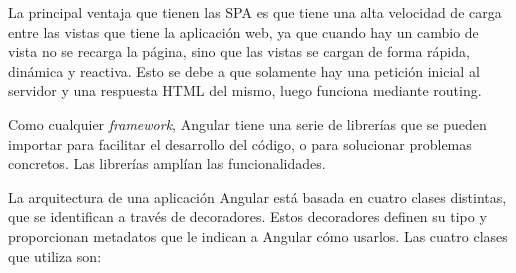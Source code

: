\documentclass[a4paper, 12pt]{book}
\begin{document}
La principal ventaja que tienen las SPA es que tiene una alta velocidad de carga entre las vistas que tiene la aplicación web, ya que cuando hay un cambio de vista no se recarga la página, sino que las vistas se cargan de forma rápida, dinámica y reactiva. 
Esto se debe a que solamente hay una petición inicial al servidor y una respuesta HTML del mismo, luego funciona mediante routing.

Como cualquier \emph{framework}, Angular tiene una serie de librerías que se pueden importar para facilitar el desarrollo del código, o para solucionar problemas concretos. 
Las librerías amplían las funcionalidades.

La arquitectura de una aplicación Angular está basada en cuatro clases distintas, que se identifican a través de decoradores. 
Estos decoradores definen su tipo y proporcionan metadatos que le indican a Angular cómo usarlos.
Las cuatro clases que utiliza son:
\end{document}

